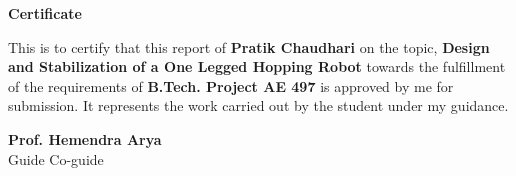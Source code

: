 \newpage
\vspace*{0.75in}
\label{pg:certi}
\begin{center}
{\bf \Huge Certificate}\\[0.5in]
\end{center}
{\normalsize This is to certify that this report of {\bf Pratik Chaudhari} on the topic, {\bf Design and
Stabilization of a One Legged Hopping Robot} towards the fulfillment of the requirements of {\bf B.Tech.
Project AE 497}
is approved by me for submission. It represents the work carried out by the student under my guidance.}\\[1in]

\begin{center}
{\bf \large Prof. Hemendra Arya} \hspace{1.2in}{\bf \large Prof. Bhartendu Seth}\\[0.1in]
{\normalsize Guide \hspace{2.9in} Co-guide\\[0.1in]}
\end{center}

